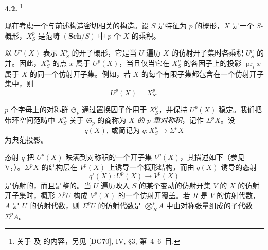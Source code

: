 
\medskip
\noindent\textbf{4.2.}
\label{sga3:VIIA:4.2}
\footnote{关于  及  的内容，另见
\textup{[DG70]}, IV, \S3, 第~4--6~目.}

现在考虑一个与前述构造密切相关的构造。设 \(S\) 是特征为 \(p\) 的概形，\(X\) 是一个 \(S\)-概形，\(X_S^p\) 是范畴 \((\mathbf{Sch}/S)\) 中 \(p\) 个 \(X\) 的乘积。

以 \(U^p(X)\) 表示 \(X_S^p\) 的开子概形，它是当 \(U\) 遍历 \(X\) 的仿射开子集时各乘积 \(U_S^p\) 的并。因此，\(X_S^p\) 的点 \(x\) 属于 \(U^p(X)\)，当且仅当它在 \(X_S^p\) 的各因子上的投影 \(\operatorname{pr}_i x\) 属于 \(X\) 的同一个仿射开子集。例如，若 \(X\) 的每个有限子集都包含在一个仿射开子集中，则
\[
  U^p(X)=X_S^p.
\]

\(p\) 个字母上的对称群 \(\mathfrak S_p\) 通过置换因子作用于 \(X_S^p\)，并保持 \(U^p(X)\) 稳定。我们把带环空间范畴中 \(X_S^p\) 关于 \(\mathfrak S_p\) 的商称为 \emph{\(X\) 的 \(p\) 重对称积}，记作 \(\Sigma^p X\)。设
\[
  q(X),\ \text{或简记为 }q:
  X_S^p\longrightarrow\Sigma^p X
\]
为典范投影。

态射 \(q\) 把 \(U^p(X)\) 映满到对称积的一个开子集 \(V^p(X)\)，其描述如下（参见 V，）。\(\Sigma^p X\) 的结构层在 \(V^p(X)\) 上诱导一个概形结构，而由 \(q(X)\) 诱导的态射
\[
  q'(X):U^p(X)\longrightarrow V^p(X)
\]
是仿射的，而且是整的。当 \(U\) 遍历映入 \(S\) 的某个变动的仿射开集 \(V\) 的 \(X\) 的仿射开子集时，概形 \(\Sigma^p U\) 构成 \(V^p(X)\) 的一个仿射开覆盖。若 \(R\) 是 \(V\) 的仿射代数，\(A\) 是 \(U\) 的仿射代数，则 \(\Sigma^p U\) 的仿射代数是 \(\bigotimes_R^p A\) 中由对称张量组成的子代数 \(\Sigma^p A\)。

